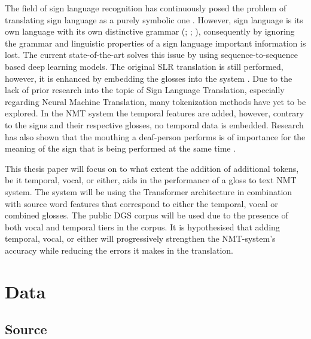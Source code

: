The field of sign language recognition has continuously posed the problem of translating sign language as a purely symbolic one \cite{camgoz2018neural}. However, sign language is its own language with its own distinctive grammar (\citealp{perniss2007}; \citealp{camgoz2018neural}; \citealp{camgoz2020sign}), consequently by ignoring the grammar and linguistic properties of a sign language important information is lost. The current state-of-the-art solves this issue by using sequence-to-sequence based deep learning models. The original SLR translation is still performed, however, it is enhanced by embedding the glosses into the system \cite{camgoz2018neural}. Due to the lack of prior research into the topic of Sign Language Translation, especially regarding Neural Machine Translation, many tokenization methods have yet to be explored. In the NMT system the temporal features are added, however, contrary to the signs and their respective glosses, no temporal data is embedded. Research has also shown that the mouthing a deaf-person performs is of importance for the meaning of the sign that is being performed at the same time \cite{kristoffersen2016designing}. 

This thesis paper will focus on to what extent the addition of additional tokens, be it temporal, vocal, or either, aids in the performance of a gloss to text NMT system. The system will be using the Transformer architecture in combination with source word features \cite{garcia2016factored} that correspond to either the temporal, vocal or combined glosses. The public DGS corpus \cite{dgscorpus_3} will be used due to the presence of both vocal and temporal tiers in the corpus. It is hypothesised that adding temporal, vocal, or either will progressively strengthen the NMT-system's accuracy while reducing the errors it makes in the translation.


\section{Data}


\subsection{Source}

